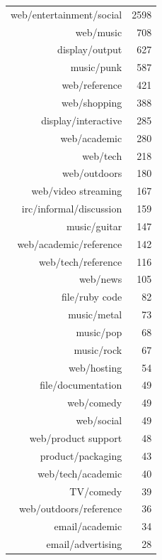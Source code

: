 \documentclass[xcolor=x11names,compress,handout]{beamer}
\begin{document}
{\begin{columns}
        \begin{table}[ht]
            \centering
            \begin{tabular}{rr}
                web/entertainment/social & 2598 \\ 
                web/music & 708 \\ 
                display/output & 627 \\ 
                music/punk & 587 \\ 
                web/reference & 421 \\ 
                web/shopping & 388 \\ 
                display/interactive & 285 \\ 
                web/academic & 280 \\ 
                web/tech & 218 \\ 
                web/outdoors & 180 \\ 
                web/video streaming & 167 \\ 
                irc/informal/discussion & 159 \\ 
                music/guitar & 147 \\ 
                web/academic/reference & 142 \\ 
                web/tech/reference & 116 \\ 
                web/news & 105 \\ 
                file/ruby code &  82 \\ 
                music/metal &  73 \\ 
                music/pop &  68 \\ 
                music/rock &  67 \\ 
                web/hosting &  54 \\ 
                file/documentation &  49 \\ 
                web/comedy &  49 \\ 
                web/social &  49 \\ 
                web/product support &  48 \\ 
                product/packaging &  43 \\ 
                web/tech/academic &  40 \\ 
                TV/comedy &  39 \\ 
                web/outdoors/reference &  36 \\ 
                email/academic &  34 \\ 
                email/advertising &  28 \\ 

\end{tabular}
\end{table}
\end{columns}}
\end{document}
